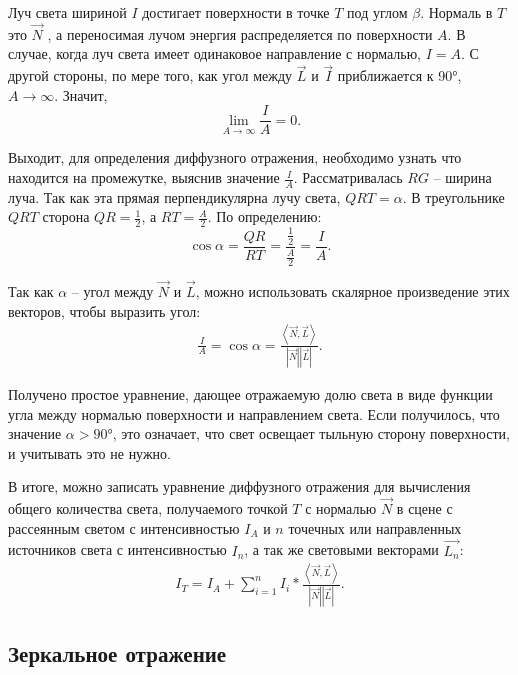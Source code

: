 Луч света шириной $I$ достигает поверхности в точке $T$ под углом $\beta$. Нормаль в $T$ это $\vec{N}$ , а переносимая лучом энергия распределяется по поверхности $A$. В случае, когда луч света имеет одинаковое направление с нормалью, $I=A$. С другой стороны, по мере того, как угол между $\vec{L}$ и $\vec{I}$ приближается к 90°, $A\to\infty$. Значит,
\begin{equation}
\lim_{A\to\infty} \frac{I}{A} = 0.
\end{equation}

Выходит, для определения диффузного отражения, необходимо узнать что находится на промежутке, выяснив значение $\frac{I}{A}$. Рассматривалась $RG$ – ширина луча. Так как эта прямая перпендикулярна лучу света, $QRT = \alpha$. В треугольнике $QRT$ сторона $QR=\frac{1}{2}$, а $RT=\frac{A}{2}$. По определению:
\begin{equation}
\cos{\alpha}=\frac{QR}{RT}=\frac{\frac{1}{2}}{\frac{A}{2}}=\frac{I}{A}.
\end{equation}

Так как $\alpha$ – угол между $\vec{N}$ и $\vec{L}$, можно использовать скалярное произведение этих векторов, чтобы выразить угол:
\begin{gather}
	\frac{I}{A}=\cos{\alpha}=\frac{\left\langle{\vec{N}, \vec{L}}\right\rangle}{\left| {\vec{N}} \right| \left| {\vec{L}} \right|}.
\end{gather}

Получено простое уравнение, дающее отражаемую долю света в виде функции угла между нормалью поверхности и направлением света. Если получилось, что значение $\alpha > 90°$, это означает, что свет освещает тыльную сторону поверхности, и учитывать это не нужно.

В итоге, можно записать уравнение диффузного отражения для вычисления общего количества света, получаемого точкой $T$ с нормалью $\vec{N}$ в сцене с рассеянным светом с интенсивностью $I_{A}$ и $n$ точечных или направленных источников света с интенсивностью $I_{n}$, а так же световыми векторами $\vec{L_{n}}$:
\begin{gather}
	I_{T} =  I_{A} + \sum_{i=1}^n I_{i}*\frac{\left\langle{\vec{N}, \vec{L}}\right\rangle}{\left| {\vec{N}} \right| \left| {\vec{L}} \right|}.
\end{gather}

\subsection{Зеркальное отражение}

